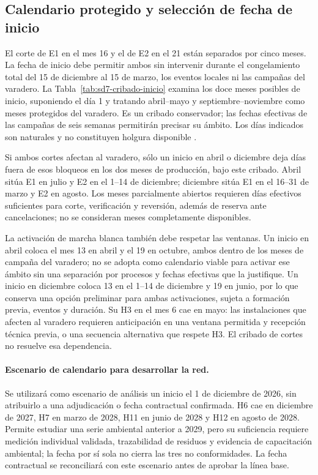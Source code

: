\subsection{Calendario protegido y selección de fecha de inicio}
El corte de E1 en el mes 16 y el de E2 en el 21 están separados por cinco meses. La fecha de inicio debe permitir ambos sin intervenir durante el congelamiento total del 15 de diciembre al 15 de marzo, los eventos locales ni las campañas del varadero. La Tabla~\ref{tab:sd7-cribado-inicio} examina los doce meses posibles de inicio, suponiendo el día 1 y tratando abril--mayo y septiembre--noviembre como meses protegidos del varadero. Es un cribado conservador; las fechas efectivas de las campañas de seis semanas permitirán precisar su ámbito. Los días indicados son naturales y no constituyen holgura disponible \parencite[cap.~10; RT-10.05; cap.~13]{caso07}.



Si ambos cortes afectan al varadero, sólo un inicio en abril o diciembre deja días fuera de esos bloqueos en los dos meses de producción, bajo este cribado. Abril sitúa E1 en julio y E2 en el 1--14 de diciembre; diciembre sitúa E1 en el 16--31 de marzo y E2 en agosto. Los meses parcialmente abiertos requieren días efectivos suficientes para corte, verificación y reversión, además de reserva ante cancelaciones; no se consideran meses completamente disponibles.

La activación de marcha blanca también debe respetar las ventanas. Un inicio en abril coloca el mes 13 en abril y el 19 en octubre, ambos dentro de los meses de campaña del varadero; no se adopta como calendario viable para activar ese ámbito sin una separación por procesos y fechas efectivas que la justifique. Un inicio en diciembre coloca 13 en el 1--14 de diciembre y 19 en junio, por lo que conserva una opción preliminar para ambas activaciones, sujeta a formación previa, eventos y duración. Su H3 en el mes 6 cae en mayo: las instalaciones que afecten al varadero requieren anticipación en una ventana permitida y recepción técnica previa, o una secuencia alternativa que respete H3. El cribado de cortes no resuelve esa dependencia.

\paragraph{Escenario de calendario para desarrollar la red.}
Se utilizará como escenario de análisis un inicio el 1 de diciembre de 2026, sin atribuirlo a una adjudicación o fecha contractual confirmada. H6 cae en diciembre de 2027, H7 en marzo de 2028, H11 en junio de 2028 y H12 en agosto de 2028. Permite estudiar una serie ambiental anterior a 2029, pero su suficiencia requiere medición individual validada, trazabilidad de residuos y evidencia de capacitación ambiental; la fecha por sí sola no cierra las tres no conformidades. La fecha contractual se reconciliará con este escenario antes de aprobar la línea base.

